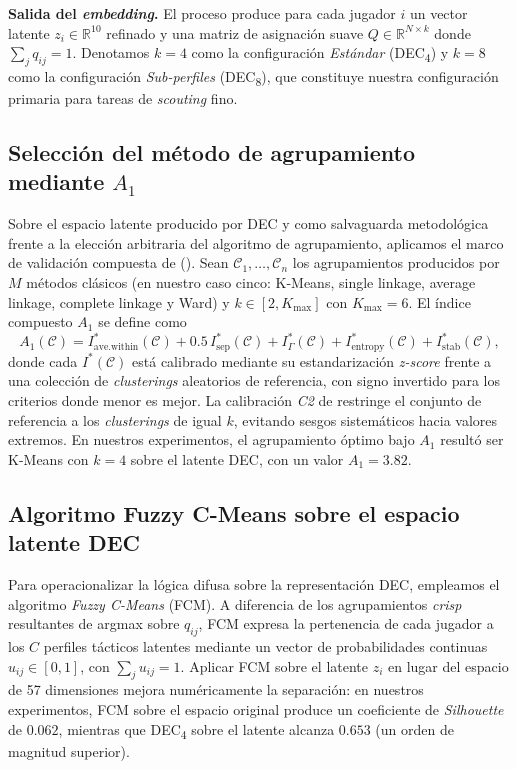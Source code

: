 \documentclass[conference]{IEEEtran}
\begin{document}
\textbf{Salida del \textit{embedding}.} El proceso produce para cada jugador $i$ un vector latente $z_i \in \mathbb{R}^{10}$ refinado y una matriz de asignación suave $Q \in \mathbb{R}^{N \times k}$ donde $\sum_j q_{ij} = 1$. Denotamos $k=4$ como la configuración \textit{Estándar} (DEC\textsubscript{4}) y $k=8$ como la configuración \textit{Sub-perfiles} (DEC\textsubscript{8}), que constituye nuestra configuración primaria para tareas de \textit{scouting} fino.

\subsection{Selección del método de agrupamiento mediante $A_1$}
\label{subsec:emre_a1}
Sobre el espacio latente producido por DEC y como salvaguarda metodológica frente a la elección arbitraria del algoritmo de agrupamiento, aplicamos el marco de validación compuesta de \citeauthor{akhanli2022clustering} (\citeyear{akhanli2022clustering}). Sean $\mathcal{C}_1, \dots, \mathcal{C}_n$ los agrupamientos producidos por $M$ métodos clásicos (en nuestro caso cinco: K-Means, single linkage, average linkage, complete linkage y Ward) y $k \in [2, K_{\max}]$ con $K_{\max}=6$. El índice compuesto $A_1$ se define como
\begin{equation}
A_1(\mathcal{C}) = I^{*}_{\mathrm{ave.within}}(\mathcal{C}) + 0.5\, I^{*}_{\mathrm{sep}}(\mathcal{C}) + I^{*}_{\Gamma}(\mathcal{C}) + I^{*}_{\mathrm{entropy}}(\mathcal{C}) + I^{*}_{\mathrm{stab}}(\mathcal{C}),
\label{eq:a1}
\end{equation}
donde cada $I^{*}(\mathcal{C})$ está calibrado mediante su estandarización \textit{z-score} frente a una colección de \textit{clusterings} aleatorios de referencia, con signo invertido para los criterios donde menor es mejor. La calibración \textit{C2} de \citeauthor{akhanli2022clustering} restringe el conjunto de referencia a los \textit{clusterings} de igual $k$, evitando sesgos sistemáticos hacia valores extremos. En nuestros experimentos, el agrupamiento óptimo bajo $A_1$ resultó ser K-Means con $k=4$ sobre el latente DEC, con un valor $A_1 = 3.82$.

\subsection{Algoritmo Fuzzy C-Means sobre el espacio latente DEC}
\label{subsec:fcm}
Para operacionalizar la lógica difusa sobre la representación DEC, empleamos el algoritmo \textit{Fuzzy C-Means} (FCM). A diferencia de los agrupamientos \textit{crisp} resultantes de argmax sobre $q_{ij}$, FCM expresa la pertenencia de cada jugador a los $C$ perfiles tácticos latentes mediante un vector de probabilidades continuas $u_{ij} \in [0,1]$, con $\sum_j u_{ij} = 1$. Aplicar FCM sobre el latente $z_i$ en lugar del espacio de 57 dimensiones mejora numéricamente la separación: en nuestros experimentos, FCM sobre el espacio original produce un coeficiente de \textit{Silhouette} de $0.062$, mientras que DEC\textsubscript{4} sobre el latente alcanza $0.653$ (un orden de magnitud superior).
\end{document}
